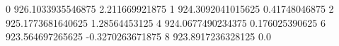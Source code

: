 0 926.1033935546875 2.211669921875
1 924.3092041015625 0.41748046875
2 925.1773681640625 1.28564453125
4 924.0677490234375 0.176025390625
6 923.564697265625 -0.3270263671875
8 923.8917236328125 0.0
